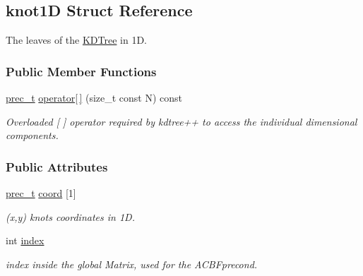 \hypertarget{structknot1D}{
\subsection{knot1D Struct Reference}
\label{structknot1D}
}
The leaves of the \hyperlink{namespaceKDTree}{KDTree} in 1D.  


\subsubsection*{Public Member Functions}
\begin{CompactItemize}
\item 
\hyperlink{Traits_8hpp_81f62fadeebafe942380746e380c72a5}{prec\_\-t} \hyperlink{structknot1D_e057579d51678ab186944232b6b0233e}{operator\mbox{[}$\,$\mbox{]}} (size\_\-t const N) const 
\begin{CompactList}\small\item\em Overloaded \mbox{[} \mbox{]} operator required by kdtree++ to access the individual dimensional components. \item\end{CompactList}\end{CompactItemize}
\subsubsection*{Public Attributes}
\begin{CompactItemize}
\item 
\hypertarget{structknot1D_355710b4bc5656588e85bb6276677a45}{
\hyperlink{Traits_8hpp_81f62fadeebafe942380746e380c72a5}{prec\_\-t} \hyperlink{structknot1D_355710b4bc5656588e85bb6276677a45}{coord} \mbox{[}1\mbox{]}}
\label{structknot1D_355710b4bc5656588e85bb6276677a45}

\begin{CompactList}\small\item\em (x,y) knots coordinates in 1D. \item\end{CompactList}\item 
\hypertarget{structknot1D_0da952810f883c551a1da128b5fbdea3}{
int \hyperlink{structknot1D_0da952810f883c551a1da128b5fbdea3}{index}}
\label{structknot1D_0da952810f883c551a1da128b5fbdea3}

\begin{CompactList}\small\item\em index inside the global Matrix, used for the ACBFprecond. \item\end{CompactList}\end{CompactItemize}


